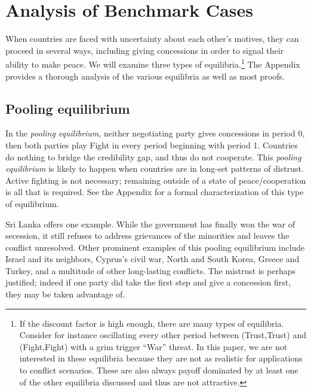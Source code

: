 \documentclass[12pt, letterpaper]{article}
\begin{document}
\section{Analysis of Benchmark Cases}
\label{sec:bench}
When countries are faced with uncertainty about each other's motives, they can proceed in several ways, including giving concessions in order to signal their ability to make peace. We will examine three types of equilibria.\footnote{If the discount factor is high enough, there are many types of equilibria. Consider for instance oscillating every other period between (Trust,Trust) and (Fight,Fight) with a grim trigger ``War'' threat. In this paper, we are not interested in these equilibria because they are not as realistic for applications to conflict scenarios. These are also always payoff dominated by at least one of the other equilibria discussed and thus 	are not attractive.} The Appendix provides a thorough analysis of the various equilibria as well as most proofs. 

\subsection{Pooling equilibrium}
In the \emph{pooling equilibrium}, neither negotiating party gives concessions in period 0, then both parties play Fight in every period beginning with period 1. Countries do nothing to bridge the credibility gap, and thus do not cooperate. This \emph{pooling equilibrium} is likely to happen when countries are in long-set patterns of distrust. Active fighting is not necessary; remaining outside of a state of peace/cooperation is all that is required.  See the Appendix for a formal characterization of this type of equilibrium. 


Sri Lanka offers one example. While the government has finally won the war of secession, it still refuses to address grievances of the minorities and leaves the conflict unresolved. Other prominent examples of this pooling equilibrium include Israel and its neighbors, Cyprus's civil war, North and South Korea, Greece and Turkey, and a multitude of other long-lasting conflicts. The mistrust is perhaps justified; indeed if one party did take the first step and give a concession first, they may be taken advantage of. 
\end{document}
